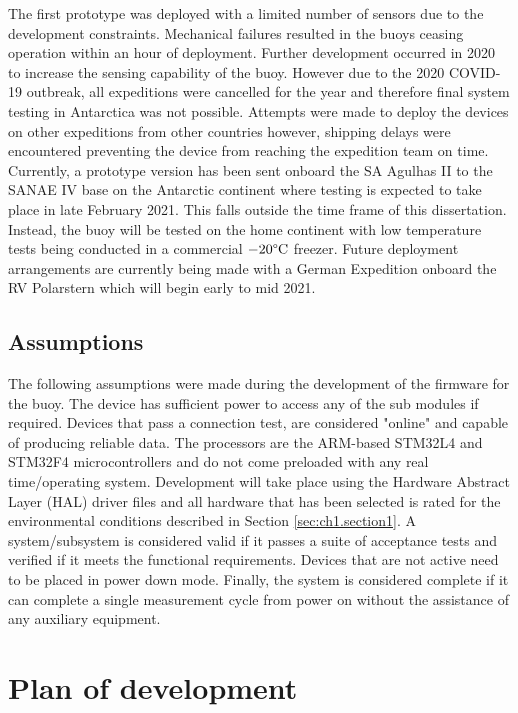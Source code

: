 The first prototype was deployed with a limited number of sensors due to the development constraints. Mechanical failures resulted in the buoys ceasing operation within an hour of deployment. Further development occurred in 2020 to increase the sensing capability of the buoy. However due to the 2020 COVID-19 outbreak, all expeditions were cancelled for the year and therefore final system testing in Antarctica was not possible. Attempts were made to deploy the devices on other expeditions from other countries however, shipping delays were encountered preventing the device from reaching the expedition team on time. Currently, a prototype version has been sent onboard the SA Agulhas II to the SANAE IV base on the Antarctic continent where testing is expected to take place in late February 2021. This falls outside the time frame of this dissertation. Instead, the buoy will be tested on the home  continent with low temperature tests being conducted in a commercial $-20\degree \text{C}$ freezer. Future deployment arrangements are currently being made with a German Expedition onboard the RV Polarstern which will begin early to mid 2021.

\subsection{Assumptions}

The following assumptions were made during the development of the firmware for the buoy. The device has sufficient power to access any of the sub modules if required. Devices that pass a connection test, are considered "online" and capable of producing reliable data. The processors are the ARM-based  STM32L4 and STM32F4 microcontrollers and do not come preloaded with any real time/operating system. Development will take place using the Hardware Abstract Layer (HAL) driver files and all hardware that has been selected is rated for the environmental conditions described in Section \ref{sec:ch1.section1}. A system/subsystem is considered valid if it passes a suite of acceptance tests and verified if it meets the functional requirements. Devices that are not active need to be placed in power down mode. Finally, the system is considered complete if it can complete a single measurement cycle from power on without the assistance of any auxiliary equipment.

\section{Plan of development}
\label{sec:ch1.section3}

